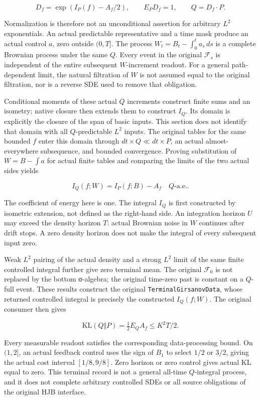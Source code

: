 \documentclass[
  english,
  11pt,
  oneside]{book}
\begin{document}
\[D_f=\exp(I_P(f)-A_f/2),\qquad E_P D_f=1,\qquad Q=D_f\cdot P.\]

Normalization is therefore not an unconditional assertion for arbitrary \(L^2\) exponentials. An actual predictable representative and a time mask produce an actual control \(a\), zero outside \((0,T]\). The process \(W_t=B_t-\int_0^t a_s\,ds\) is a complete Brownian process under the same \(Q\). Every event in the original \(\mathcal F_s\) is independent of the entire subsequent \(W\)-increment readout. For a general path-dependent limit, the natural filtration of \(W\) is not assumed equal to the original filtration, nor is a reverse SDE used to remove that obligation.

Conditional moments of these actual \(Q\) increments construct finite sums and an isometry; native closure then extends them to construct \(I_Q\). Its domain is explicitly the closure of the span of basic inputs. This section does not identify that domain with all \(Q\)-predictable \(L^2\) inputs. The original tables for the same bounded \(f\) enter this domain through \(dt\times Q\ll dt\times P\), an actual almost-everywhere subsequence, and bounded convergence. Proving substitution of \(W=B-\int a\) for actual finite tables and comparing the limits of the two actual sides yields

\[I_Q(f;W)=I_P(f;B)-A_f\quad Q\text{-a.e.}.\]

The coefficient of energy here is one. The integral \(I_Q\) is first constructed by isometric extension, not defined as the right-hand side. An integration horizon \(U\) may exceed the density horizon \(T\): actual Brownian noise in \(W\) continues after drift stops. A zero density horizon does not make the integral of every subsequent input zero.

Weak \(L^2\) pairing of the actual density and a strong \(L^2\) limit of the same finite controlled integral further give zero terminal mean. The original \(\mathcal F_0\) is not replaced by the bottom σ-algebra; the original time-zero past is constant on a \(Q\)-full event. These results construct the original \nolinkurl{TerminalGirsanovData}, whose returned controlled integral is precisely the constructed \(I_Q(f;W)\). The original consumer then gives

\[\mathrm{KL}(Q\Vert P)=\tfrac12 E_Q A_f\le K^2T/2.\]

Every measurable readout satisfies the corresponding data-processing bound. On \((1,2]\), an actual feedback control uses the sign of \(B_1\) to select \(1/2\) or \(3/2\), giving the actual cost interval \([1/8,9/8]\). Zero horizon or zero control gives actual KL equal to zero. This terminal record is not a general all-time \(Q\)-integral process, and it does not complete arbitrary controlled SDEs or all source obligations of the original HJB interface.
\end{document}
